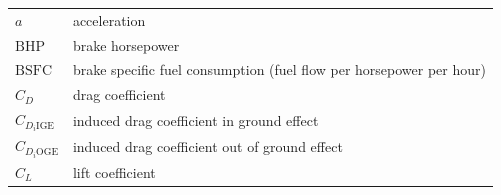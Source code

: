 \documentclass[
]{book}
\begin{document}
\begin{longtable}[]{@{}ll@{}}
\toprule
\endhead
\begin{minipage}[t]{0.14\columnwidth}\raggedright
\(a\)\strut
\end{minipage} & \begin{minipage}[t]{0.80\columnwidth}\raggedright
acceleration\strut
\end{minipage}\tabularnewline
\begin{minipage}[t]{0.14\columnwidth}\raggedright
\(\mathrm{BHP}\)\strut
\end{minipage} & \begin{minipage}[t]{0.80\columnwidth}\raggedright
brake horsepower\strut
\end{minipage}\tabularnewline
\begin{minipage}[t]{0.14\columnwidth}\raggedright
\(\mathrm{BSFC}\)\strut
\end{minipage} & \begin{minipage}[t]{0.80\columnwidth}\raggedright
brake specific fuel consumption (fuel flow per horsepower per hour)\strut
\end{minipage}\tabularnewline
\begin{minipage}[t]{0.14\columnwidth}\raggedright
\(C_D\)\strut
\end{minipage} & \begin{minipage}[t]{0.80\columnwidth}\raggedright
drag coefficient\strut
\end{minipage}\tabularnewline
\begin{minipage}[t]{0.14\columnwidth}\raggedright
\(C_{D_i \mathrm{IGE}}\)\strut
\end{minipage} & \begin{minipage}[t]{0.80\columnwidth}\raggedright
induced drag coefficient in ground effect\strut
\end{minipage}\tabularnewline
\begin{minipage}[t]{0.14\columnwidth}\raggedright
\(C_{D_i \mathrm{OGE}}\)\strut
\end{minipage} & \begin{minipage}[t]{0.80\columnwidth}\raggedright
induced drag coefficient out of ground effect\strut
\end{minipage}\tabularnewline
\begin{minipage}[t]{0.14\columnwidth}\raggedright
\(C_L\)\strut
\end{minipage} & \begin{minipage}[t]{0.80\columnwidth}\raggedright
lift coefficient\strut
\end{minipage}\tabularnewline

\end{longtable}
\end{document}
